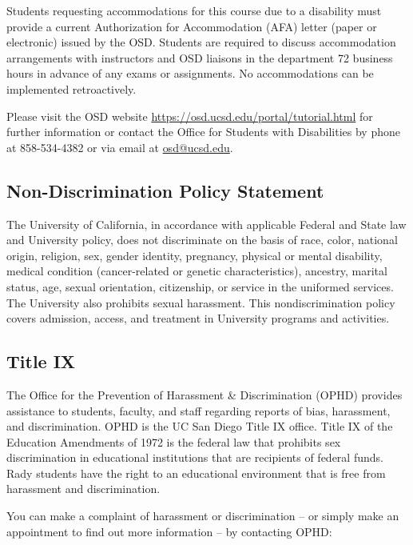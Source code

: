 \documentclass[12pt]{article}
\begin{document}
Students requesting accommodations for this course due to a disability must provide a current Authorization for Accommodation (AFA) letter (paper or electronic) issued by the OSD. Students are required to discuss accommodation arrangements with instructors and OSD liaisons in the department 72 business hours in advance of any exams or assignments. No accommodations can be implemented retroactively.

Please visit the OSD website \url{https://osd.ucsd.edu/portal/tutorial.html} for further information or contact the Office for Students with Disabilities by phone at 858-534-4382 or via email at \href{mailto:osd@ucsd.edu}{osd@ucsd.edu}. 

\vspace{0.5cm}


\subsection*{Non-Discrimination Policy Statement}

The University of California, in accordance with applicable Federal and State law and University policy, does not discriminate on the basis of race, color, national origin, religion, sex, gender identity, pregnancy, physical or mental disability, medical condition (cancer-related or genetic characteristics), ancestry, marital status, age, sexual orientation, citizenship, or service in the uniformed services. The University also prohibits sexual harassment. This nondiscrimination policy covers admission, access, and treatment in University programs and activities.

\vspace{0.5cm}


\subsection*{Title IX}

The Office for the Prevention of Harassment \& Discrimination (OPHD) provides assistance to students, faculty, and staff regarding reports of bias, harassment, and discrimination. OPHD is the UC San Diego Title IX office. Title IX of the Education Amendments of 1972 is the federal law that prohibits sex discrimination in educational institutions that are recipients of federal funds. Rady students have the right to an educational environment that is free from harassment and discrimination.
 
You can make a complaint of harassment or discrimination -- or simply make an appointment to find out more information -- by contacting OPHD:
\end{document}
